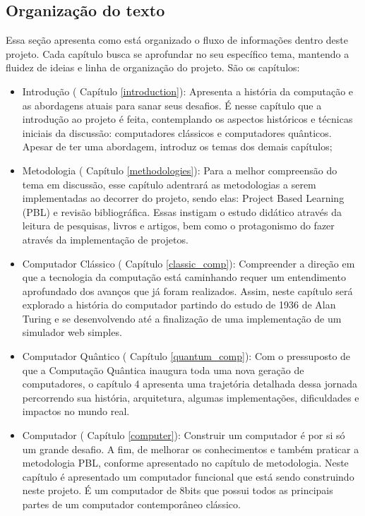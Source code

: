 \subsection{Organização do texto}
Essa seção apresenta como está organizado o fluxo de informações dentro deste projeto. Cada capítulo busca se aprofundar no seu específico tema, mantendo a fluidez de ideias e linha de organização do projeto. São os capítulos:

\begin{itemize}
  \item Introdução ( Capítulo \ref{introduction}): Apresenta a história da computação e as abordagens atuais para sanar seus desafios. É nesse capítulo que a introdução ao projeto é feita, contemplando os aspectos históricos e técnicas iniciais da discussão: computadores clássicos e computadores quânticos. Apesar de ter uma abordagem, introduz os temas dos demais capítulos;
  \item Metodologia ( Capítulo \ref{methodologies}): Para a melhor compreensão do tema em discussão, esse capítulo adentrará as metodologias a serem implementadas ao decorrer do projeto, sendo elas: Project Based Learning (PBL) e revisão bibliográfica. Essas instigam o estudo didático através da leitura de pesquisas, livros e artigos, bem como o protagonismo do fazer através da implementação de projetos.
  \item Computador Clássico ( Capítulo \ref{classic_comp}): Compreender a direção em que a tecnologia da computação está caminhando requer um entendimento aprofundado dos avanços que já foram realizados. Assim, neste capítulo será explorado a história do computador partindo do estudo de 1936 de Alan Turing e se desenvolvendo até a finalização de uma implementação de um simulador web simples.
  \item Computador Quântico ( Capítulo \ref{quantum_comp}): Com o pressuposto de que a Computação Quântica inaugura toda uma nova geração de computadores, o capítulo 4 apresenta uma trajetória detalhada dessa jornada percorrendo sua história, arquitetura, algumas implementações, dificuldades e impactos no mundo real.
  \item Computador ( Capítulo \ref{computer}): Construir um computador é por si só um grande desafio. A fim, de melhorar os conhecimentos e também praticar a metodologia PBL, conforme apresentado no capítulo de metodologia. Neste capítulo é apresentado um computador funcional que está sendo construindo neste projeto. É um computador de 8bits que possui todos as principais partes de um computador contemporâneo clássico.

\end{itemize}
